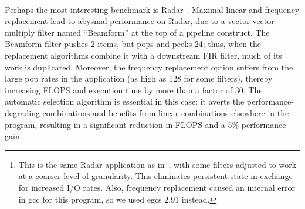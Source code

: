 Perhaps the most interesting benchmark is Radar\footnote{\small This
is the same Radar application as in~\cite{streamit-asplos}, with some
filters adjusted to work at a coarser level of granularity.  This
eliminates persistent state in exchange for increased I/O rates.
Also, frequency replacement caused an internal error in gcc for this
program, so we used egcs 2.91 instead.}.  Maximal linear and frequency
replacement lead to abysmal performance on Radar, due to a
vector-vector multiply filter named ``Beamform'' at the top of a pipeline
construct.  The Beamform filter pushes 2 items, but pops and peeks 24;
thus, when the replacement algorithms combine it with a downstream FIR
filter, much of its work is duplicated.  Moreover, the frequency
replacement option suffers from the large pop rates in the application
(as high as 128 for some filters), thereby increasing FLOPS and
execution time by more than a factor of 30.  The automatic selection
algorithm is essential in this case: it averts the
performance-degrading combinations and benefits from linear
combinations elsewhere in the program, resulting in a significant
reduction in FLOPS and a 5\% performance gain.

